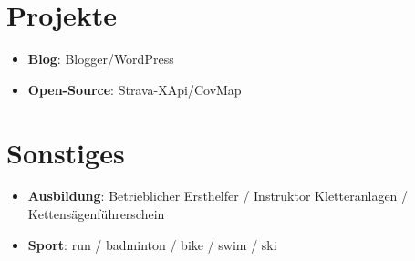 \documentclass[a4paper,11pt]{article}
\newcommand{\resumeItem}[2]{
  \item\small{
    \textbf{#1}{: #2 \vspace{-2pt}}
  }
}
\newcommand{\resumeSubItem}[2]{\resumeItem{#1}{#2}\vspace{-4pt}}
\newcommand{\resumeSubHeadingListStart}{\begin{itemize}[leftmargin=*]}
\newcommand{\resumeSubHeadingListEnd}{\end{itemize}}
\begin{document}
\section{Projekte}
  \resumeSubHeadingListStart
    \resumeSubItem{Blog}
      {Blogger/WordPress}
    \resumeSubItem{Open-Source}
      {Strava-XApi/CovMap}
  \resumeSubHeadingListEnd
\section{Sonstiges}
  \resumeSubHeadingListStart
    \resumeSubItem{Ausbildung}
      {Betrieblicher Ersthelfer / Instruktor Kletteranlagen / Kettensägenführerschein}
    \resumeSubItem{Sport}
      {run / badminton / bike / swim / ski}
  \resumeSubHeadingListEnd

%
\end{document}
